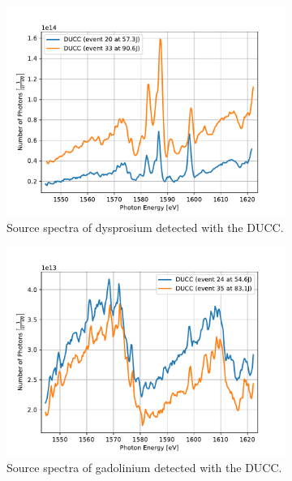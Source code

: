 \begin{figure} [H]
\begin{subfigure}[t]{0.49\textwidth}
		\centering
		\includegraphics[width=\textwidth]{Data_Analysis/basic_spectra/spectra_of_Dy_events_20_33.pdf}
		\caption{Source spectra of dysprosium detected with the DUCC.}
		\label{}
	\end{subfigure}%
	\hfill
	\begin{subfigure}[t]{0.49\textwidth}
		\centering
		\includegraphics[width=\textwidth]{Data_Analysis/basic_spectra/spectra_of_Gd_events_24_35.pdf}
		\caption{Source spectra of gadolinium detected with the DUCC.}
		\label{}
	\end{subfigure}
	\begin{subfigure}[t]{0.49\textwidth}
		\centering

\end{subfigure}
\end{figure}
